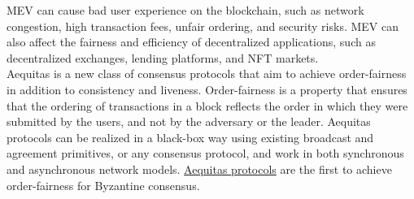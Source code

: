 MEV can cause bad user experience on the blockchain, such as network congestion, high transaction fees, unfair ordering, and security risks. MEV can also affect the fairness and efficiency of decentralized applications, such as decentralized exchanges, lending platforms, and NFT markets.\\
Aequitas is a new class of consensus protocols that aim to achieve order-fairness in addition to consistency and liveness. Order-fairness is a property that ensures that the ordering of transactions in a block reflects the order in which they were submitted by the users, and not by the adversary or the leader. Aequitas protocols can be realized in a black-box way using existing broadcast and agreement primitives, or any consensus protocol, and work in both synchronous and asynchronous network models. \href{https://eprint.iacr.org/2020/269.pdf}{Aequitas protocols} are the first to achieve order-fairness for Byzantine consensus.
